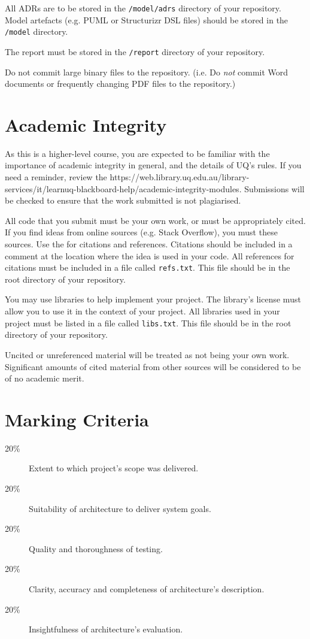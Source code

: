 \documentclass{csse4400}
\begin{document}
All ADRs are to be stored in the \texttt{/model/adrs} directory of your repository.
Model artefacts (e.g. PUML or Structurizr DSL files) should be stored in the \texttt{/model} directory.

The report must be stored in the \texttt{/report} directory of your repository.

Do not commit large binary files to the repository.
(i.e. Do \emph{not} commit Word documents or frequently changing PDF files to the repository.)


\section{Academic Integrity}
As this is a higher-level course, you are expected to be familiar with the importance of academic integrity in general, and the details of UQ's rules.
If you need a reminder, review the 
{https://web.library.uq.edu.au/library-services/it/learnuq-blackboard-help/academic-integrity-modules}.
Submissions will be checked to ensure that the work submitted is not plagiarised.

All code that you submit must be your own work, or must be appropriately cited.
If you find ideas from online sources (e.g. Stack Overflow), you must  these sources.
Use the  for citations and references.
Citations should be included in a comment at the location where the idea is used in your code.
All references for citations must be included in a file called \texttt{refs.txt}.
This file should be in the root directory of your repository.

You may use libraries to help implement your project.
The library's license must allow you to use it in the context of your project.
All libraries used in your project must be listed in a file called \texttt{libs.txt}.
This file should be in the root directory of your repository.

Uncited or unreferenced material will be treated as not being your own work.
Significant amounts of cited material from other sources will be considered to be of no academic merit.


\section{Marking Criteria}

\begin{description}
    \item[20\%] Extent to which project's scope was delivered.
    \item[20\%] Suitability of architecture to deliver system goals.
    \item[20\%] Quality and thoroughness of testing.
    \item[20\%] Clarity, accuracy and completeness of architecture's description.
    \item[20\%] Insightfulness of architecture's evaluation.
\end{description}




\end{document}
